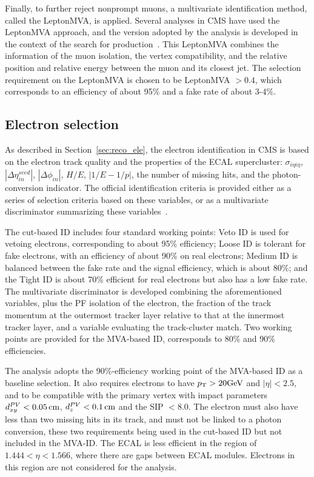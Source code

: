 Finally, to further reject nonprompt muons, a multivariate identification method, called the LeptonMVA, is applied.
Several analyses in CMS have used the LeptonMVA approach, and the version adopted by the \hmm analysis is developed in 
the context of the search for \tZq production~\cite{PhysRevLett.122.132003}.
This LeptonMVA combines the information of the muon isolation, the vertex compatibility, and the relative position and relative energy between the muon and its closest jet.
The selection requirement on the LeptonMVA is chosen to be LeptonMVA $> 0.4$, 
which corresponds to an efficiency of about 95\% and a fake rate of about 3-4\%. 

\subsection{Electron selection}\label{sec:sel_ele}

As described in Section~\ref{sec:reco_ele}, 
the electron identification in CMS is based on the electron track quality and the properties of the ECAL supercluster:
$\sigma_{i\eta{}i\eta}$,  $|\Delta\eta^{seed}_{in}|$, $|\Delta\phi_{in}|$, $H/E$, $|1/E-1/p|$, the number of missing hits, and the photon-conversion indicator. 
The official identification criteria is provided either as a series of selection criteria based on these variables, 
or as a multivariate discriminator summarizing these variables~\cite{cmscollaboration2020electron}.

The cut-based ID includes four standard working points: 
Veto ID is used for vetoing electrons, corresponding to about 95\% efficiency;
Loose ID is tolerant for fake electrons, with an efficiency of about 90\% on real electrons;
Medium ID is balanced between the fake rate and the signal efficiency, which is about 80\%;
and the Tight ID is about 70\% efficient for real electrons but also has a low fake rate.
The multivariate discriminator is developed combining the aforementioned variables, 
plus the PF isolation of the electron, the fraction of the track momentum at the outermost tracker layer relative to that at the innermost tracker layer, 
and a variable evaluating the track-cluster match.
Two working points are provided for the MVA-based ID, corresponds to 80\% and 90\% efficiencies.

The \hmm analysis adopts the 90\%-efficiency working point of the MVA-based ID as a baseline selection.
It also requires electrons to have $p_{\mathrm{T}} > 20 \mbox{GeV}$ and $|\eta| < 2.5$, 
and to be compatible with the primary vertex with impact parameters
$d^{PV}_{xy} < 0.05 \,\text{cm}$, $d^{PV}_{z} < 0.1 \,\text{cm}$ and the SIP $< 8.0$. 
The electron must also have less than two missing hits in its track, and must not be linked to a photon conversion,
these two requirements being used in the cut-based ID but not included in the MVA-ID.
The ECAL is less efficient in the region of $1.444 < \eta < 1.566$, where there are gaps between ECAL modules.
Electrons in this region are not considered for the analysis.

